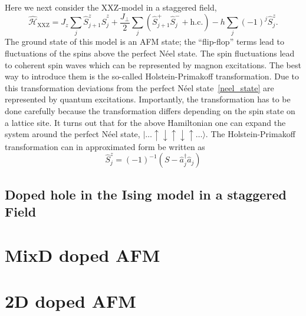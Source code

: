 \documentclass[11pt]{book}
\newcommand{\ket}[1]{|#1\rangle}
\renewcommand{\a}{\hat{a}}
\newcommand{\Sz}{\hat{S}^z}
\newcommand{\Sp}{\hat{S}^+}
\newcommand{\Sm}{\hat{S}^-}
\renewcommand{\H}{\hat{\mathcal{H}}}
\newcommand{\hc}{\text{h.c.}}
\begin{document}
Here we next consider the XXZ-model in a staggered field,
\begin{equation}
  \H_{\text{XXZ}} = J_z \sum_j \Sz_{j+1}\Sz_{j} + \frac{J_\perp}{2} \sum_{j} \left( \Sp_{j+1}\Sm_j+ \hc\right) - h \sum_j {(-1)}^{j} \Sz_j.
\end{equation}
The ground state of this model is an AFM state; the ``flip-flop'' terms lead to fluctuations of the spins above the perfect N\'eel state.
The spin fluctuations lead to coherent spin waves which can be represented by magnon excitations. The best way to introduce them is the so-called Holstein-Primakoff transformation. Due to this transformation deviations from the perfect N\'eel state~\eqref{neel_state} are represented by quantum excitations. Importantly, the transformation has to be done carefully because the transformation differs depending on the spin state on a lattice site. It turns out that for the above Hamiltonian one can expand the system around the perfect N\'eel state, $ \ket{\dots\uparrow\downarrow\uparrow\downarrow\uparrow\dots} $. 
The Holstein-Primakoff transformation can in approximated form be written as 
\begin{equation}
  \Sz_j = \left( -1\right)^{-1}\left( S - \a^\dagger_j \a_j \right)
\end{equation}

\section{Doped hole in the Ising model in a staggered Field}\label{section2.5}


\clearpage
\newpage
\chapter{MixD doped AFM}\label{chapter6}



\clearpage
\newpage
\chapter{2D doped AFM}\label{chapter7}


\clearpage
\newpage


\appendix
\end{document}
